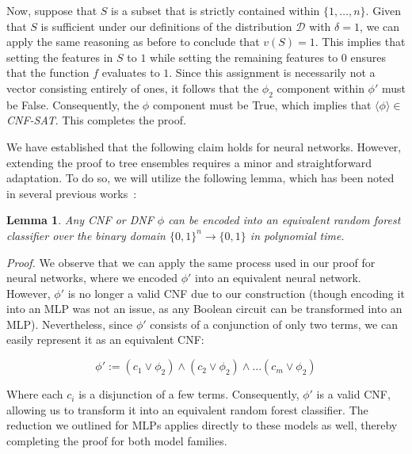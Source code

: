 \documentclass{article}
\newtheorem{lemma}{Lemma}
\begin{document}
Now, suppose that $ S$ is a subset that is strictly contained within $ \{1,\ldots,n\} $. Given that $S $ is sufficient under our definitions of the distribution $ \mathcal{D}$ with $ \delta=1 $, we can apply the same reasoning as before to conclude that $ v(S)=1 $. This implies that setting the features in $ S $ to $ 1 $ while setting the remaining features to $0 $ ensures that the function $ f $ evaluates to $ 1$. Since this assignment is necessarily not a vector consisting entirely of ones, it follows that the $ \phi_2 $ component within $ \phi' $ must be False. Consequently, the $\phi$ component must be True, which implies that  $\langle \phi\rangle\in$\emph{CNF-SAT}. This completes the proof.

We have established that the following claim holds for neural networks. However, extending the proof to tree ensembles requires a minor and straightforward adaptation. To do so, we will utilize the following lemma, which has been noted in several previous works~\citep{ordyniak2024explaining, audemard2022trading}:

\begin{lemma}
    \label{boolean_circuit_mlp_lemma}
    Any CNF or DNF $\phi$ can be encoded into an equivalent random forest classifier over the binary domain $\{0,1\}^n\to \{0,1\}$ in polynomial time.
\end{lemma}

\emph{Proof.} We observe that we can apply the same process used in our proof for neural networks, where we encoded $\phi'$ into an equivalent neural network. However, $\phi'$ is no longer a valid CNF due to our construction (though encoding it into an MLP was not an issue, as any Boolean circuit can be transformed into an MLP). Nevertheless, since $\phi'$ consists of a conjunction of only two terms, we can easily represent it as an equivalent CNF:


\begin{equation}
    \phi':= (c_1 \vee \phi_2) \wedge (c_2 \vee \phi_2) \wedge \ldots (c_m \vee \phi_2)
\end{equation}

Where each $c_i$ is a disjunction of a few terms. Consequently, $\phi'$ is a valid CNF, allowing us to transform it into an equivalent random forest classifier. The reduction we outlined for MLPs applies directly to these models as well, thereby completing the proof for both model families.

\end{document}
